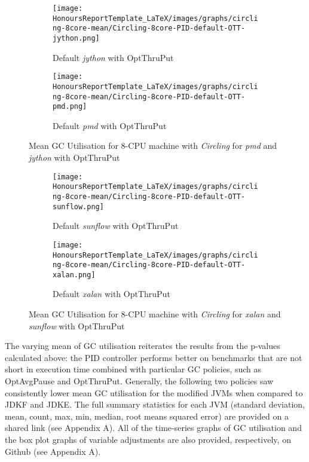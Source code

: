 \newpage
\begin{figure} [H]
\begin{subfigure}{1\textwidth}
\texttt{[image: HonoursReportTemplate\_LaTeX/images/graphs/circling-8core-mean/Circling-8core-PID-default-OTT-jython.png]}
\caption{Default \emph{jython} with OptThruPut}
\label{fig:circling-mean-17}
\end{subfigure}
\begin{subfigure}{1\textwidth}
\texttt{[image: HonoursReportTemplate\_LaTeX/images/graphs/circling-8core-mean/Circling-8core-PID-default-OTT-pmd.png]}
\caption{Default \emph{pmd} with OptThruPut}
\label{fig:circling-mean-18}
\end{subfigure}
\caption{Mean GC Utilisation for 8-CPU machine with \emph{Circling} for \emph{pmd} and \emph{jython} with OptThruPut}
\end{figure}
\newpage
\begin{figure} [H]
\begin{subfigure}{1\textwidth}
\texttt{[image: HonoursReportTemplate\_LaTeX/images/graphs/circling-8core-mean/Circling-8core-PID-default-OTT-sunflow.png]}
\caption{Default \emph{sunflow} with OptThruPut}
\label{fig:circling-mean-19}
\end{subfigure}
\begin{subfigure}{1\textwidth}
\texttt{[image: HonoursReportTemplate\_LaTeX/images/graphs/circling-8core-mean/Circling-8core-PID-default-OTT-xalan.png]}
\caption{Default \emph{xalan} with OptThruPut}
\label{fig:circling-mean-20}
\end{subfigure}
    \caption{Mean GC Utilisation for 8-CPU machine with \emph{Circling} for \emph{xalan} and \emph{sunflow} with OptThruPut}
    \label{fig:mean-GC-Util3}
\end{figure}
\newpage
The varying mean of GC utilisation reiterates the results from the p-values
calculated above: the PID controller performs better on benchmarks that are
not short in execution time combined with particular GC policies, such
as OptAvgPause and OptThruPut. Generally, the following two policies saw
consistently lower mean GC utilisation for the modified JVMs when
compared to JDKF and JDKE.
\newline\newline
The full summary statistics for each JVM (standard deviation, mean,
count, max, min, median, root means squared error) are provided on a
shared link (see Appendix A). All of the time-series graphs of GC utilisation
and the box plot graphs of variable adjustments are also provided,
respectively, on Github (see Appendix A).
